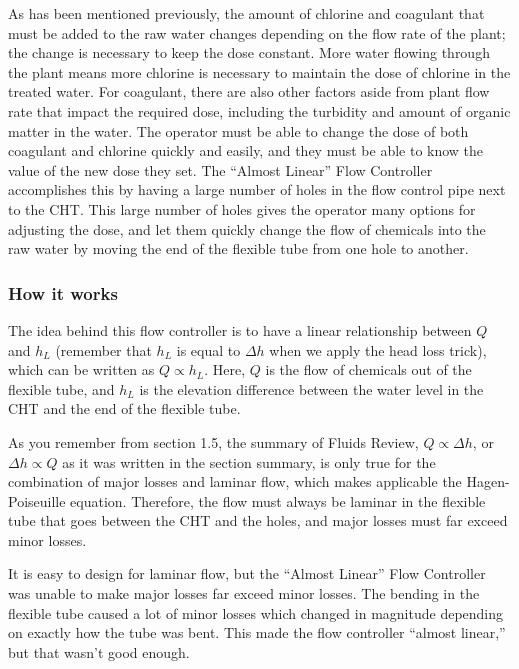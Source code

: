 \documentclass[letterpaper,10pt,english]{sphinxmanual}
\begin{document}
As has been mentioned previously, the amount of chlorine and coagulant that must be added to the raw water changes depending on the flow rate of the plant; the change is necessary to keep the dose constant. More water flowing through the plant means more chlorine is necessary to maintain the dose of chlorine in the treated water. For coagulant, there are also other factors aside from plant flow rate that impact the required dose, including the turbidity and amount of organic matter in the water. The operator must be able to change the dose of both coagulant and chlorine quickly and easily, and they must be able to know the value of the new dose they set. The “Almost Linear” Flow Controller accomplishes this by having a large number of holes in the flow control pipe next to the CHT. This large number of holes gives the operator many options for adjusting the dose, and let them quickly change the flow of chemicals into the raw water by moving the end of the flexible tube from one hole to another.


\subsubsection{How it works}
\label{\detokenize{Flow_Control_and_Measurement/FCM_Design:how-it-works}}
The idea behind this flow controller is to have a linear relationship between \(Q\) and \(h_L\) (remember that \(h_L\) is equal to \(\Delta h\) when we apply the head loss trick), which can be written as \(Q \propto h_L\). Here, \(Q\) is the flow of chemicals out of the flexible tube, and \(h_L\) is the elevation difference between the water level in the CHT and the end of the flexible tube.

As you remember from section 1.5, the summary of Fluids Review, \(Q \propto \Delta h\), or \(\Delta h \propto Q\) as it was written in the section summary, is only true for the combination of major losses and laminar flow, which makes applicable the Hagen-Poiseuille equation. Therefore, the flow must always be laminar in the flexible tube that goes between the CHT and the holes, and major losses must far exceed minor losses.

It is easy to design for laminar flow, but the “Almost Linear” Flow Controller was unable to make major losses far exceed minor losses. The bending in the flexible tube caused a lot of minor losses which changed in magnitude depending on exactly how the tube was bent. This made the flow controller “almost linear,” but that wasn’t good enough.
\end{document}
